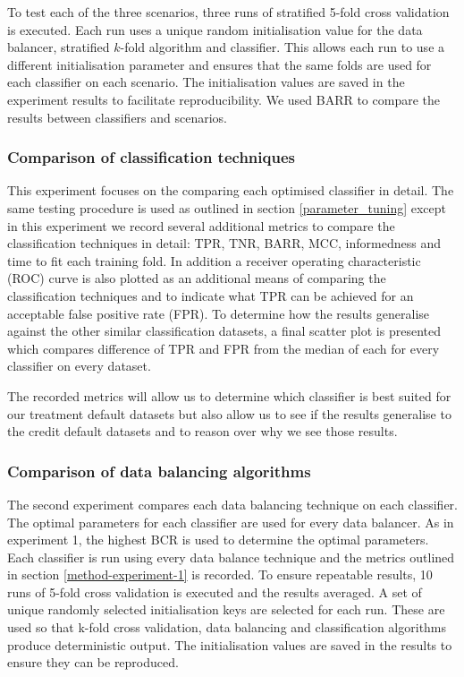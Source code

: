 \documentclass{sig-alternate-05-2015}
\begin{document}
	To test each of the three scenarios, three runs of stratified 5-fold cross validation is executed. Each run uses a unique random initialisation value for the data balancer, stratified $k$-fold algorithm and classifier. This allows each run to use a different initialisation parameter and ensures that the same folds are used for each classifier on each scenario. The initialisation values are saved in the experiment results to facilitate reproducibility. We used BARR to compare the results between classifiers and scenarios.
	
	\subsubsection{Comparison of classification techniques}
	\label{comparision_of_classification_technique}
	This experiment focuses on the comparing each optimised classifier in detail. The same testing procedure is used as outlined in section \ref{parameter_tuning} except in this experiment we record several additional metrics to compare the classification techniques in detail: TPR, TNR, BARR, MCC, informedness and time to fit each training fold. In addition a receiver operating characteristic (ROC) curve is also plotted as an additional means of comparing the classification techniques and to indicate what TPR can be achieved for an acceptable false positive rate (FPR). To determine how the results generalise against the other similar classification datasets, a final scatter plot is presented which compares difference of TPR and FPR from the median of each for every classifier on every dataset.
	
	The recorded metrics will allow us to determine which classifier is best suited for our treatment default datasets but also allow us to see if the results generalise to the credit default datasets and to reason over why we see those results.
	
	\subsubsection{Comparison of data balancing algorithms}
	The second experiment compares each data balancing technique on each classifier. The optimal parameters for each classifier are used for every data balancer. As in experiment 1, the highest BCR is used to determine the optimal parameters. Each classifier is run using every data balance technique and the metrics outlined in section \ref{method-experiment-1} is recorded. To ensure repeatable results, 10 runs of 5-fold cross validation is executed and the results averaged. A set of unique randomly selected initialisation keys are selected for each run. These are used so that k-fold cross validation, data balancing and classification algorithms produce deterministic output. The initialisation values are saved in the results to ensure they can be reproduced.
	
\end{document}
